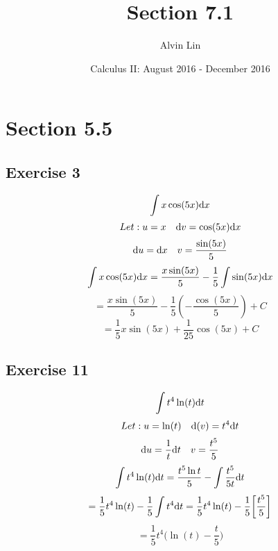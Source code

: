 \documentclass{math}
\title{Section 7.1}
\author{Alvin Lin}
\date{Calculus II: August 2016 - December 2016}
\begin{document}
\maketitle

\section*{Section 5.5}

\subsection*{Exercise 3}
\[ \int{x\cos(5x)\mathrm{d}{x}} \]
\[ Let: u = x\quad \mathrm{d}{v} = \cos(5x)\mathrm{d}{x} \]
\[ \mathrm{d}{u} = \mathrm{d}{x}\quad v = \frac{\sin(5x)}{5} \]
\[ \int{x\cos(5x)\mathrm{d}{x}} =
   \frac{x\sin(5x)}{5}-\frac{1}{5}\int{\sin(5x)\mathrm{d}{x}} \]
\[ = \frac{x\sin(5x)}{5}-\frac{1}{5}(-\frac{\cos(5x)}{5})+C \]
\[ = \frac{1}{5}x\sin(5x)+\frac{1}{25}\cos(5x)+C \]

\subsection*{Exercise 11}
\[ \int{t^{4}\ln(t)\mathrm{d}{t}} \]
\[ Let: u = \ln(t) \quad \mathrm{d}(v) = t^{4}\mathrm{d}{t} \]
\[ \mathrm{d}{u} = \frac{1}{t}\mathrm{d}{t} \quad v = \frac{t^{5}}{5} \]
\[ \int{t^{4}\ln(t)\mathrm{d}{t}} =
   \frac{t^{5}\ln{t}}{5}-\int{\frac{t^{5}}{5t}\mathrm{d}{t}} \]
\[ = \frac{1}{5}t^{4}\ln(t)-\frac{1}{5}\int{t^{4}}\mathrm{d}{t}
   = \frac{1}{5}t^{4}\ln(t)-\frac{1}{5}\bigg[\frac{t^{5}}{5}\bigg] \]
\[ = \frac{1}{5}t^{4}\bigg(\ln(t)-\frac{t}{5}\bigg) \]
\end{document}
